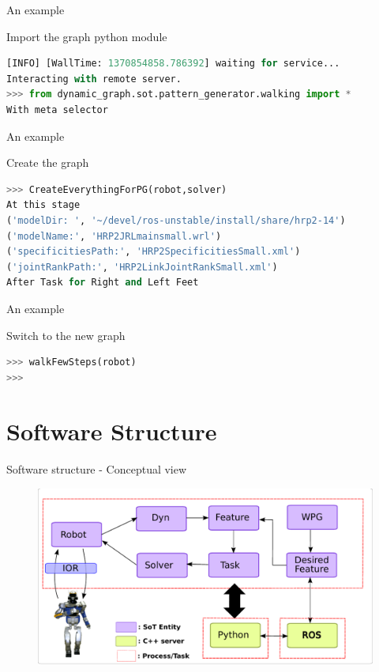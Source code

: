 \begin{frame}[fragile]{An example}
\begin{block}{Import the graph python module}
  \begin{lstlisting}[language=Python,basicstyle=\small,backgroundcolor=\color{AliceBlue}, frame=single,showlines=false]
[INFO] [WallTime: 1370854858.786392] waiting for service...
Interacting with remote server.
>>> from dynamic_graph.sot.pattern_generator.walking import *
With meta selector
  \end{lstlisting}
\end{block}
\end{frame}


\begin{frame}[fragile]{An example}
\begin{block}{Create the graph}
  \begin{lstlisting}[language=Python,basicstyle=\small,backgroundcolor=\color{AliceBlue}, frame=single,showlines=false]
>>> CreateEverythingForPG(robot,solver)
At this stage
('modelDir: ', '~/devel/ros-unstable/install/share/hrp2-14')
('modelName:', 'HRP2JRLmainsmall.wrl')
('specificitiesPath:', 'HRP2SpecificitiesSmall.xml')
('jointRankPath:', 'HRP2LinkJointRankSmall.xml')
After Task for Right and Left Feet
  \end{lstlisting}
\end{block}
\end{frame}


\begin{frame}[fragile]{An example}
  \begin{block}{Switch to the new graph}       
    \begin{lstlisting}[language=Python,basicstyle=\small,backgroundcolor=\color{AliceBlue}, frame=single,showlines=false]
>>> walkFewSteps(robot)
>>> 
    \end{lstlisting}
  \end{block}
\end{frame}

\section{Software Structure}

\begin{frame}{Software structure - Conceptual view}
  \begin{figure}
    \includegraphics[width=\linewidth]{./figures/Concept-Fig}
  \end{figure}
\end{frame}

